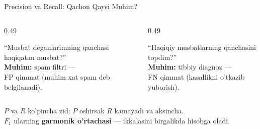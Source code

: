 \documentclass[aspectratio=169,11pt]{beamer}
\begin{document}
\begin{frame}{Precision va Recall: Qachon Qaysi Muhim?}
  \begin{columns}[T]
    \begin{column}{0.49\textwidth}
      \begin{tcolorbox}[defbox,title=Precision $P=TP/(TP{+}FP)$]
        \small
        ``Musbat deganlarimning qanchasi haqiqatan musbat?''\\[4pt]
        \textbf{Muhim:} spam filtri ---\\
        FP qimmat (muhim xat spam
        deb belgilanadi).
      \end{tcolorbox}
    \end{column}
    \begin{column}{0.49\textwidth}
      \begin{tcolorbox}[defbox,title=Recall $R=TP/(TP{+}FN)$]
        \small
        ``Haqiqiy musbatlarning qanchasini topdim?''\\[4pt]
        \textbf{Muhim:} tibbiy diagnoz ---\\
        FN qimmat (kasallikni
        o'tkazib yuborish).
      \end{tcolorbox}
    \end{column}
  \end{columns}
  \vspace{6pt}
  \begin{tcolorbox}[warnbox,title=Savdoning ikki tomoni]
    \small
    $P$ va $R$ ko'pincha zid:
    $P$ oshirsak $R$ kamayadi va aksincha.\\[3pt]
    $F_1$ ularning \textbf{garmonik o'rtachasi} ---
    ikkalasini birgalikda hisobga oladi.
  \end{tcolorbox}
\end{frame}
\end{document}
